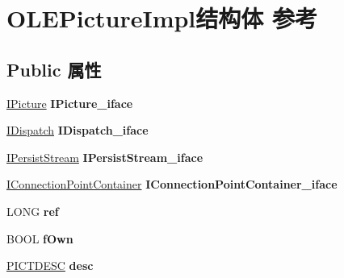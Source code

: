 \hypertarget{struct_o_l_e_picture_impl}{}\section{O\+L\+E\+Picture\+Impl结构体 参考}
\label{struct_o_l_e_picture_impl}
\subsection*{Public 属性}
\begin{DoxyCompactItemize}
\item 
\mbox{\label{struct_o_l_e_picture_impl_aefc46e0041a5387be0d48c6f2222ec06}} 
\hyperlink{interface_i_picture}{I\+Picture} {\bfseries I\+Picture\+\_\+iface}
\item 
\mbox{\label{struct_o_l_e_picture_impl_ac117fbc2144a7262ab69750fd83b18fd}} 
\hyperlink{interface_i_dispatch}{I\+Dispatch} {\bfseries I\+Dispatch\+\_\+iface}
\item 
\mbox{\label{struct_o_l_e_picture_impl_ad7f32d934cbe70d0f5de58361bc24cdf}} 
\hyperlink{interface_i_persist_stream}{I\+Persist\+Stream} {\bfseries I\+Persist\+Stream\+\_\+iface}
\item 
\mbox{\label{struct_o_l_e_picture_impl_a47fad3361b9f9c1a0fcd9265afb669b8}} 
\hyperlink{interface_i_connection_point_container}{I\+Connection\+Point\+Container} {\bfseries I\+Connection\+Point\+Container\+\_\+iface}
\item 
\mbox{\label{struct_o_l_e_picture_impl_a2c669a4a13df9f8ba725b91b2c2b5fe3}} 
L\+O\+NG {\bfseries ref}
\item 
\mbox{\label{struct_o_l_e_picture_impl_a17127103d3301a833246fe4e9e4d63b8}} 
B\+O\+OL {\bfseries f\+Own}
\item 
\mbox{\label{struct_o_l_e_picture_impl_a6045ee6339c4db9a494906a470d01198}} 
\hyperlink{structtag_p_i_c_t_d_e_s_c}{P\+I\+C\+T\+D\+E\+SC} {\bfseries desc}
\item 
\mbox{\label{struct_o_l_e_picture_impl_a5870bad22cef5f6edf150a2064c41983}} 

\end{DoxyCompactItemize}
